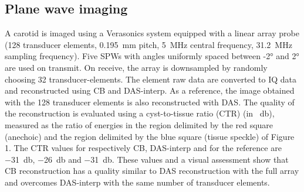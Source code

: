 \documentclass[conference]{IEEEtran}
\begin{document}
\subsection{Plane wave imaging}
\label{subsec:PW_exp}
A carotid is imaged using a Verasonics system equipped with a linear array probe (128 transducer elements, \SI{0.195}{\mm} pitch, \SI{5}{\mega\hertz} central frequency, \SI{31.2}{\mega\hertz} sampling frequency). Five SPWs with angles uniformly spaced between \ang{-2} and \ang{2} are used on transmit. On receive, the array is downsampled by randomly choosing 32 transducer-elements. The element raw data are converted to IQ data and reconstructed using CB and DAS-interp. As a reference, the image obtained with the 128 transducer elements is also reconstructed with DAS.
The quality of the reconstruction is evaluated using a cyst-to-tissue ratio (CTR) (in \SI{}{\decibel}), measured as the ratio of energies in the region delimited by the red square (anechoic) and  the region delimited by the blue square (tissue speckle) of Figure 1. The CTR values for respectively CB, DAS-interp and for the reference are \SI{-31}{\decibel}, \SI{-26}{\decibel} and \SI{-31}{\decibel}. These values and a visual assessment show that CB reconstruction has a quality similar to DAS reconstruction with the full array and overcomes DAS-interp with the same number of transducer elements.
\newlength{\CarotidFigWidth} \setlength{\CarotidFigWidth}{0.32\textwidth}
\newlength{\CarotidFigHeight}
\end{document}

